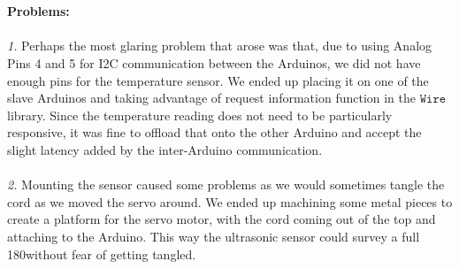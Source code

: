 \documentclass[paper=a4, fontsize=11pt]{scrartcl}
\numberwithin{equation}{section}		%
\numberwithin{figure}{section}			%
\numberwithin{table}{section}				%
\begin{document}
{\\\\
\textbf{Problems: }\\\\
\textit{1.} Perhaps the most glaring problem that arose was that, due to using Analog Pins 4 and 5 for I2C communication between the Arduinos, we did not have enough pins for the temperature sensor. We ended up placing it on one of the slave Arduinos and taking advantage of request information function in the $\texttt{Wire}$ library. Since the temperature reading does not need to be particularly responsive, it was fine to offload that onto the other Arduino and accept the slight latency added by the inter-Arduino communication.
\\\\
\textit{2.} Mounting the sensor caused some problems as we would sometimes tangle the cord as we moved the servo around. We ended up machining some metal pieces to create a platform for the servo motor, with the cord coming out of the top and attaching to the Arduino. This way the ultrasonic sensor could survey a full 180\degree  without fear of getting tangled.

}
\end{document}
